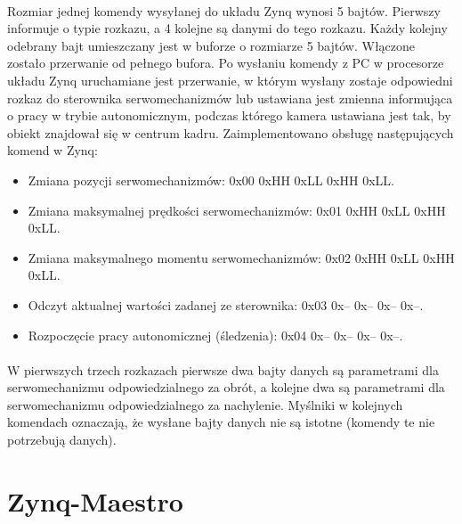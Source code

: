 \paragraph*{}
Rozmiar jednej komendy wysyłanej do układu Zynq wynosi 5 bajtów.
Pierwszy informuje o typie rozkazu, a 4 kolejne są danymi do tego rozkazu.
Każdy kolejny odebrany bajt umieszczany jest w buforze o rozmiarze 5 bajtów.
Włączone zostało przerwanie od pełnego bufora.
Po wysłaniu komendy z PC w procesorze układu Zynq uruchamiane jest przerwanie, w którym wysłany zostaje odpowiedni rozkaz do sterownika serwomechanizmów lub ustawiana jest zmienna informująca o pracy w trybie autonomicznym, podczas którego kamera ustawiana jest tak, by obiekt znajdował się w centrum kadru.
Zaimplementowano obsługę następujących komend w Zynq:
\begin{itemize}
\item Zmiana pozycji serwomechanizmów: 0x00 0xHH 0xLL 0xHH 0xLL.
\item Zmiana maksymalnej prędkości serwomechanizmów: 0x01 0xHH 0xLL 0xHH 0xLL.
\item Zmiana maksymalnego momentu serwomechanizmów: 0x02 0xHH 0xLL 0xHH 0xLL.
\item Odczyt aktualnej wartości zadanej ze sterownika: 0x03 0x-- 0x-- 0x-- 0x--.
\item Rozpoczęcie pracy autonomicznej (śledzenia): 0x04 0x-- 0x-- 0x-- 0x--.
\end{itemize}
\paragraph*{}
W pierwszych trzech rozkazach pierwsze dwa bajty danych są parametrami dla serwomechanizmu odpowiedzialnego za obrót, a kolejne dwa są parametrami dla serwomechanizmu odpowiedzialnego za nachylenie. 
Myślniki w kolejnych komendach oznaczają, że wysłane bajty danych nie są istotne (komendy te nie potrzebują danych).

\section{Zynq-Maestro}
\label{sec:zynq-maestro}


